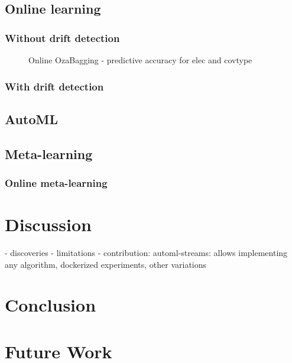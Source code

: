 \documentclass{sig-alternate-br}
\begin{document}
\subsection{Online learning}

\subsubsection{Without drift detection}
\begin{figure}[h]
\centering 
{}
\caption{Online OzaBagging - predictive accuracy for elec and covtype}
\label{fig:bathclr}
\end{figure}

\subsubsection{With drift detection}

\subsection{AutoML}

\subsection{Meta-learning}
\subsubsection{Online meta-learning}

\section{Discussion}

- discoveries
- limitations
- contribution: automl-streams: allows implementing any algorithm, dockerized experiments, other variations

\section{Conclusion}

\section{Future Work}


  
%



\end{document}
